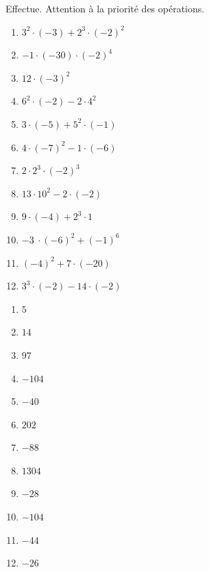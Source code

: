 \documentclass[../../syllabus_1.tex]{subfiles}
\begin{document}
\begin{exercise}
    Effectue. Attention à la priorité des opérations.
    \begin{enumerate}[itemsep=.4cm, cols=3]
        \item   \(3^{2} \cdot ( - 3) + 2^{3} \cdot ( - 2)^{2} \)
        \item \(- 1 \cdot ( - 30) \cdot ( - 2)^{4} \)
        \item \(12 \cdot ( - 3)^{2} \)
        \item \(6^{2} \cdot ( - 2) - 2 \cdot 4^{2} \)
        \item \(3 \cdot ( - 5) + 5^{2} \cdot ( - 1) \)
        \item \(4 \cdot ( - 7)^{2} - 1 \cdot ( - 6) \)
        \item \(2 \cdot  2^{3} \cdot ( - 2)^{3} \)
        \item \(13 \cdot 10^{2} - 2 \cdot ( - 2) \)
        \item \(9 \cdot ( - 4) + 2^{3} \cdot 1 \)
        \item \(- 3\  \cdot ( - 6)^{2} + ( - 1)^{6} \)
        \item \( ( - 4)^{2} + 7 \cdot ( - 20) \)
        \item \(3^{3} \cdot ( - 2) - 14 \cdot ( - 2) \)
    \end{enumerate}
\end{exercise}
\begin{solution}
    \begin{enumerate}[cols=4]
        \item \(5\)
        \item \(14\)
        \item \(97\)
        \item \(-104\)
        \item \(-40\)
        \item \(202\)
        \item \(-88\)
        \item \(1304\)
        \item \(-28\)
        \item \(-104\)
        \item \(-44\)
        \item \(-26\)
    \end{enumerate}
\end{solution}
\end{document}
